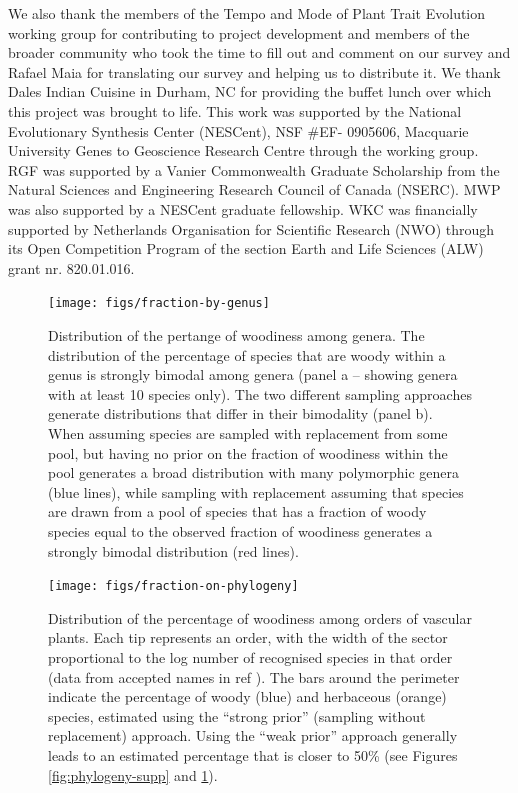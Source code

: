 \documentclass[12pt]{article}
\begin{document}
We also thank the members of the Tempo and Mode of Plant Trait
Evolution working group for contributing to project development and
members of the broader community who took the time to fill out and
comment on our survey and Rafael Maia for translating our survey and
helping us to distribute it.
We thank Dales Indian Cuisine in Durham, NC for providing the buffet
lunch over which this project was brought to life.
%
This work was supported by the National Evolutionary Synthesis Center
(NESCent), NSF \#EF- 0905606, Macquarie University Genes to Geoscience
Research Centre through the working group.
%
RGF was supported by a Vanier Commonwealth Graduate Scholarship from
the Natural Sciences and Engineering Research Council of Canada
(NSERC).
MWP was also supported by a NESCent graduate fellowship.
%
WKC was financially supported by Netherlands Organisation for
Scientific Research (NWO) through its Open Competition Program of the
section Earth and Life Sciences (ALW) grant nr. 820.01.016.




\begin{figure}[p]
  \centering
  \texttt{[image: figs/fraction-by-genus]}
  \caption{Distribution of the pertange of woodiness among genera.
    The distribution of the percentage of species that are woody within
    a genus is strongly bimodal among genera (panel a -- showing
    genera with at least 10 species only).
    The two different sampling approaches generate distributions that
    differ in their bimodality (panel b). When assuming species are
    sampled with replacement from some pool, but having no prior on
    the fraction of woodiness within the pool generates a broad
    distribution with many polymorphic genera (blue lines), while
    sampling with replacement assuming that species are drawn from a
    pool of species that has a fraction of woody species equal to the
    observed fraction of woodiness generates a strongly bimodal
    distribution (red lines).}
  \label{fig:distribution-genera}
\end{figure}

\begin{figure}[p]
  \centering
  \texttt{[image: figs/fraction-on-phylogeny]}
  \caption{Distribution of the percentage of woodiness among orders of
    vascular plants.  Each tip represents an order, with the width of
    the sector proportional to the log number of recognised species in
    that order (data from accepted names in ref \citep{ThePlantList}).
    The bars around the perimeter indicate the percentage of woody
    (blue) and herbaceous (orange) species, estimated using the
    ``strong prior'' (sampling without replacement) approach.  Using
    the ``weak prior'' approach generally leads to an estimated
    percentage that is closer to 50\% (see Figures
    \ref{fig:phylogeny-supp} and \ref{fig:distribution-genera}).}
\label{fig:phylogeny}
\end{figure}
\end{document}
